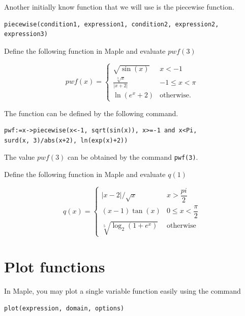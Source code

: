\documentclass[en,11pt,simple]{elegantbook}
\let\BeginKnitrBlock\begin \let\EndKnitrBlock\end
\begin{document}
Another initially know function that we will use is the piecewise function.

\begin{verbatim}
piecewise(condition1, expression1, condition2, expression2, expression3)
\end{verbatim}

\BeginKnitrBlock{example}{}{}
\protect\hypertarget{exm:unnamed-chunk-5}{}{\label{exm:unnamed-chunk-5} }
Define the following function in Maple and evaluate \(pwf(3)\)

\[
pwf(x) =
  \begin{cases}
    \sqrt{\sin(x)} & x<-1\\
    \frac{\sqrt[3]{x}}{|x+2|} & -1\leq x<\pi\\
    \ln(e^x+2) & \text{otherwise}.
  \end{cases}
\]
\EndKnitrBlock{example}

\BeginKnitrBlock{solution}{}{}
{}
The function can be defined by the following command.

\begin{verbatim}
pwf:=x->piecewise(x<-1, sqrt(sin(x)), x>=-1 and x<Pi,
surd(x, 3)/abs(x+2), ln(exp(x)+2))
\end{verbatim}

The value \(pwf(3)\) can be obtained by the command \texttt{pwf(3)}.
\EndKnitrBlock{solution}

\BeginKnitrBlock{exercise}{}{}
\protect\hypertarget{exr:piecewise-exer1}{}{\label{exr:piecewise-exer1} }
Define the following function in Maple and evaluate \(q(1)\)

\[
q(x) =
\begin{cases}
  |x-2|/\sqrt{x} & x>\dfrac{pi}{2}\\
  (x-1)\tan(x) & 0\leq x< \dfrac{\pi}{2}\\
  \sqrt[5]{\log_2(1+e^x)} & \text{otherwise}
\end{cases}
\]
\EndKnitrBlock{exercise}

\hypertarget{plot-functions}{%
\section{Plot functions}\label{plot-functions}}

In Maple, you may plot a single variable function easily using the command

\begin{verbatim}
plot(expression, domain, options)
\end{verbatim}
\end{document}
